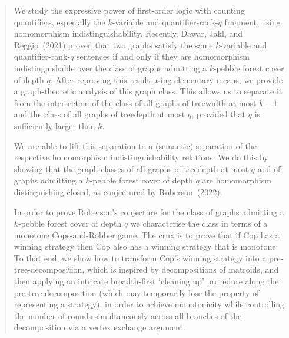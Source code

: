 \documentclass{lmcs}
\theoremstyle{plain}\newtheorem{claim}[thm]{Claim}   %
\begin{document}
\begin{abstract}
	\noindent We study the expressive power of first-order logic with counting quantifiers, especially the $k$-variable and quantifier-rank-$q$ fragment, using homomorphism indistinguishability. 
	Recently, Dawar, Jakl, and Reggio~(2021) proved that two graphs satisfy the same $k$-variable and quantifier-rank-$q$ sentences if and only if they are homomorphism indistinguishable over the class of graphs admitting a $k$-pebble forest cover of depth $q$. 
	After reproving this result using elementary means, we provide a graph-theoretic analysis of this graph class. 
	This allows us to separate it from the intersection of the class of all graphs of treewidth at most $k-1$ and the class of all graphs of treedepth at most $q$, provided that $q$ is sufficiently larger than $k$.
	
	We are able to lift this separation to a (semantic) separation of the respective homomorphism indistinguishability relations. 
	We do this by showing that the graph classes of all graphs of treedepth at most $q$ and of graphs admitting a $k$-pebble forest cover of depth $q$ are homomorphism distinguishing closed, as conjectured by Roberson~(2022).
	
	In order to prove Roberson's conjecture for the class of graphs admitting a $k$-pebble forest cover of depth $q$ we characterise the class in terms of a monotone Cops-and-Robber game.
	The crux is to prove that if Cop has a winning strategy then Cop also has a winning strategy that is monotone.
	To that end, we show how to transform Cop's winning strategy into a pre-tree-decomposition, which is inspired by decompositions of matroids, and then applying an intricate breadth-first `cleaning up' procedure along the pre-tree-decomposition (which may temporarily lose the property of representing a strategy), in order to achieve monotonicity while controlling the number of rounds simultaneously  across all branches of the decomposition via a vertex exchange argument.
\end{abstract}

\maketitle
\end{document}
